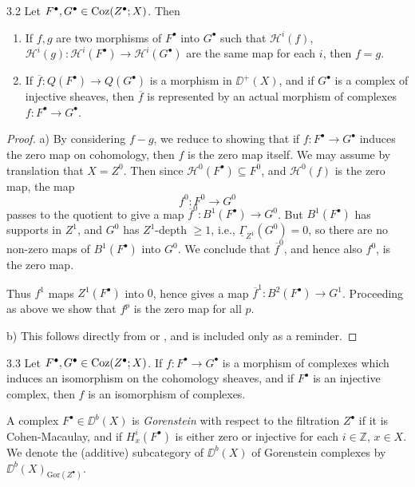 \begin{booklemma}{3.2}\label{lem:4.3.2}
Let $F^\bullet,G^\bullet\in\operatorname{Coz}(Z^\bullet;X)$. Then
\begin{enumerate}
\item[a)] If $f,g$ are two morphisms of $F^\bullet$ into $G^\bullet$ such that $\mathcal{H}^{i}(f)$, $\mathcal{H}^{i}(g)\colon \mathcal{H}^{i}(F^\bullet)\to \mathcal{H}^{i}(G^\bullet)$ are the same map for each $i$, then $f=g$.
\item[b)] If $\overline{f}\colon Q(F^\bullet)\to Q(G^\bullet)$ is a morphism in $\DD^+(X)$, and if $G^\bullet$ is a complex of injective sheaves, then $\overline{f}$ is represented by an actual morphism of complexes $f\colon F^\bullet\to G^\bullet$.
\end{enumerate}
\end{booklemma}

\begin{proof}
a) By considering $f-g$, we reduce to showing that if $f\colon F^\bullet\to G^\bullet$ induces the zero map on cohomology, then $f$ is the zero map itself. We may assume by translation that $X=Z^0$. Then since $\mathcal{H}^0(F^\bullet)\subseteq F^0$, and $\mathcal{H}^0(f)$ is the zero map, the map
\[
f^0\colon F^0\longrightarrow G^0
\]
passes to the quotient to give a map $\overline{f}^0\colon B^1(F^\bullet)\to G^0$. But $B^1(F^\bullet)$ has supports in $Z^1$, and $G^0$ has $Z^1$-depth $\geq 1$, i.e., $\underline{\Gamma}_{Z^1}(G^0)=0$, so there are no non-zero maps of $B^1(F^\bullet)$ into $G^0$. We conclude that $\overline{f}^0$, and hence also $f^0$, is the zero map.

Thus $f^1$ maps $Z^1(F^\bullet)$ into $0$, hence gives a map $\overline{f}^1\colon B^2(F^\bullet)\to G^1$. Proceeding as above we show that $f^p$ is the zero map for all $p$.

b) This follows directly from  or , and is included only as a reminder.
\end{proof}

\begin{bookcorollary}{3.3}\label{cor:4.3.3}
Let $F^\bullet,G^\bullet\in\operatorname{Coz}(Z^\bullet;X)$. If $f\colon F^\bullet\to G^\bullet$ is a morphism of complexes which induces an isomorphism on the cohomology sheaves, and if $F^\bullet$ is an injective complex, then $f$ is an isomorphism of complexes.
\end{bookcorollary}

\begin{definition*}
A complex $F^\bullet\in\DD^b(X)$ is \emph{Gorenstein} with respect to the filtration $Z^\bullet$ if it is Cohen-Macaulay, and if $H_x^{i}(F^\bullet)$ is either zero or injective for each $i\in\mathbb{Z}$, $x\in X$. We denote the (additive) subcategory of $\DD^b(X)$ of Gorenstein complexes by $\DD^b(X)_{\mathrm{Gor}(Z^\bullet)}$.
\end{definition*}

